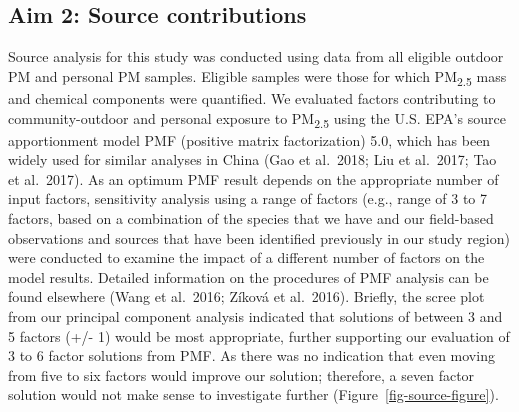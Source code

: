 \documentclass[
  letterpaper,
  DIV=11,
  numbers=noendperiod]{scrartcl}
\begin{document}
\hypertarget{aim-2-source-contributions}{%
\subsection{Aim 2: Source
contributions}\label{aim-2-source-contributions}}

Source analysis for this study was conducted using data from all
eligible outdoor PM and personal PM samples. Eligible samples were those
for which PM\textsubscript{2.5} mass and chemical components were
quantified. We evaluated factors contributing to community-outdoor and
personal exposure to PM\textsubscript{2.5} using the U.S. EPA's source
apportionment model PMF (positive matrix factorization) 5.0, which has
been widely used for similar analyses in China (Gao et al.~2018; Liu et
al.~2017; Tao et al.~2017). As an optimum PMF result depends on the
appropriate number of input factors, sensitivity analysis using a range
of factors (e.g., range of 3 to 7 factors, based on a combination of the
species that we have and our field-based observations and sources that
have been identified previously in our study region) were conducted to
examine the impact of a different number of factors on the model
results. Detailed information on the procedures of PMF analysis can be
found elsewhere (Wang et al.~2016; Zíková et al.~2016). Briefly, the
scree plot from our principal component analysis indicated that
solutions of between 3 and 5 factors (+/- 1) would be most appropriate,
further supporting our evaluation of 3 to 6 factor solutions from PMF.
As there was no indication that even moving from five to six factors
would improve our solution; therefore, a seven factor solution would not
make sense to investigate further (Figure~\ref{fig-source-figure}).
\end{document}
